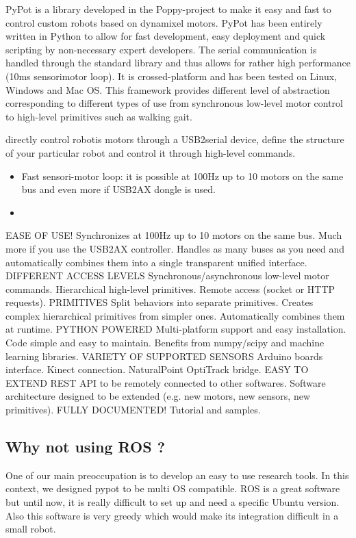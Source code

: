 PyPot is a library developed in the Poppy-project to make it easy and fast to control custom robots based on dynamixel motors. PyPot has been entirely written in Python to allow for fast development, easy deployment and quick scripting by non-necessary expert developers. The serial communication is handled through the standard library and thus allows for rather high performance (10ms sensorimotor loop). It is crossed-platform and has been tested on Linux, Windows and Mac OS. This framework provides different level of abstraction corresponding to different types of use from synchronous low-level motor control to high-level primitives such as walking gait.

directly control robotis motors through a USB2serial device,
define the structure of your particular robot and control it through high-level commands.

\begin{itemize}
    \item Fast sensori-motor loop: it is possible at 100Hz up to 10 motors on the same bus and even more if USB2AX dongle is used.
    \item
\end{itemize}

EASE OF USE!
Synchronizes at 100Hz up to 10 motors on the same bus.
Much more if you use the USB2AX controller.
Handles as many buses as you need and automatically combines them into a single transparent unified interface.
DIFFERENT ACCESS LEVELS
Synchronous/asynchronous low-level motor commands.
Hierarchical high-level primitives.
Remote access (socket or HTTP requests).
PRIMITIVES
Split behaviors into separate primitives.
Creates complex hierarchical primitives from simpler ones.
Automatically combines them at runtime.
PYTHON POWERED
Multi-platform support and easy installation.
Code simple and easy to maintain.
Benefits from numpy/scipy and machine learning libraries.
VARIETY OF SUPPORTED SENSORS
Arduino boards interface.
Kinect connection.
NaturalPoint OptiTrack bridge.
EASY TO EXTEND
REST API to be remotely connected to other softwares.
Software architecture designed to be extended (e.g. new motors, new sensors, new primitives).
FULLY DOCUMENTED!
Tutorial and samples.

\subsection{Why not using ROS ?} %
One of our main preoccupation is to develop an easy to use research tools.
In this context, we designed pypot to be multi OS compatible.
ROS is a great software but until now, it is really difficult to set up and need a specific Ubuntu version.
Also this software is very greedy which would make its integration difficult in a small robot.

